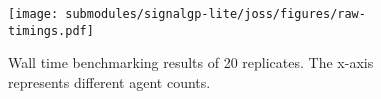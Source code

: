 \begin{figure}[h]

\centering
\texttt{[image: submodules/signalgp-lite/joss/figures/raw-timings.pdf]}

\caption{%
Wall time benchmarking results of 20 replicates.
The x-axis represents different agent counts.
} \label{fig:max-fitness-sd}

\end{figure}
